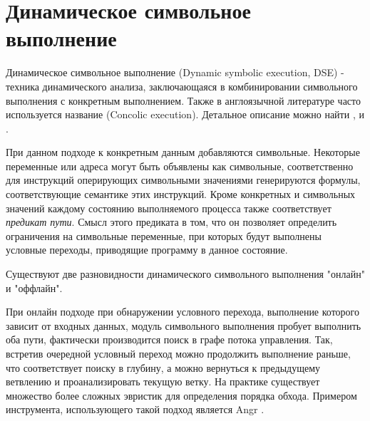 



\section{Динамическое символьное выполнение}

Динамическое символьное выполнение (Dynamic symbolic execution, DSE) - техника динамического анализа, заключающаяся в комбинировании символьного выполнения с конкретным выполнением. Также в англоязычной литературе часто используется название (Concolic execution). Детальное описание можно найти \cite{Schwartz}, \cite{PBA} и \cite{SurveySymExec}.

При данном подходе к конкретным данным добавляются символьные. Некоторые переменные или адреса могут быть объявлены как символьные, соответственно для инструкций оперирующих символьными значениями генерируются формулы, соответствующие семантике этих инструкций. Кроме конкретных и символьных значений каждому состоянию выполняемого процесса также соответствует \emph{предикат пути}. Смысл этого предиката в том, что он позволяет определить ограничения на символьные переменные, при которых будут выполнены условные переходы, приводящие программу в данное состояние.

Существуют две разновидности динамического символьного выполнения "онлайн" и "оффлайн".

При онлайн подходе при обнаружении условного перехода, выполнение которого зависит от входных данных, модуль символьного выполнения пробует выполнить оба пути, фактически производится поиск в графе потока управления. Так, встретив очередной условный переход можно продолжить выполнение раньше, что соответствует поиску в глубину, а можно вернуться к предыдущему ветвлению и проанализировать текущую ветку. На практике существует множество более сложных эвристик для определения порядка обхода.
Примером инструмента, использующего такой подход является Angr \cite{Angr}.

